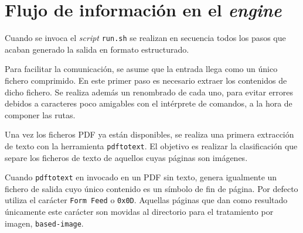 
\section{Flujo de información en el \emph{engine}}

Cuando se invoca el \emph{script} \verb|run.sh| se realizan en secuencia todos los pasos que acaban generado la salida en formato estructurado.




Para facilitar la comunicación, se asume que la entrada llega como un único fichero comprimido. En este primer paso es necesario extraer los contenidos de dicho fichero. Se realiza además un renombrado de cada uno, para evitar errores debidos a caracteres poco amigables con el intérprete de comandos, a la hora de componer las rutas.

Una vez los ficheros PDF ya están disponibles, se realiza una primera extracción de texto con la herramienta \verb|pdftotext|. El objetivo es realizar la clasificación que separe los ficheros de texto de aquellos cuyas páginas son imágenes.

Cuando \verb|pdftotext| en invocado en un PDF sin texto, genera igualmente un fichero de salida cuyo único contenido es un símbolo de fin de página. Por defecto utiliza el carácter \verb|Form Feed| o \verb|0x0D|. Aquellas páginas que dan como resultado únicamente este carácter son movidas al directorio para el tratamiento por imagen, \verb|based-image|.

